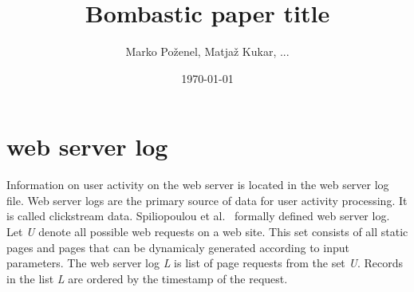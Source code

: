 \documentclass[a4paper,10pt]{article}
\title{  
 Bombastic paper title
}
\author{
    Marko Po\v{z}enel, Matja\v{z} Kukar, ...
}
\date{\today}
\begin{document}
\doublespacing
\maketitle

\section{web server log}
Information on user activity on the web server is located in the web server log file. Web server
logs are the primary source of data for user activity processing. It is called clickstream data.
Spiliopoulou et al.~\cite{Spiliopoulou2003} formally defined web server log. Let \textit{U} denote
all possible web requests on a web site. This set consists of all static pages and pages that can
be dynamicaly generated according to input parameters. The web server log \textit{L} is list of
page requests from the set \textit{U}. Records in the list \textit{L} are ordered by the timestamp
of the request.
\end{document}
